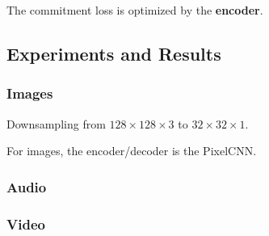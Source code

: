 The commitment loss is optimized by the \textbf{encoder}.



\subsection{Experiments and Results}

\subsubsection{Images}
Downsampling from \(128 \times 128 \times 3 \) to \( 32 \times 32 \times 1 \).

For images, the encoder/decoder is the PixelCNN. 

\subsubsection{Audio}


\subsubsection{Video}

